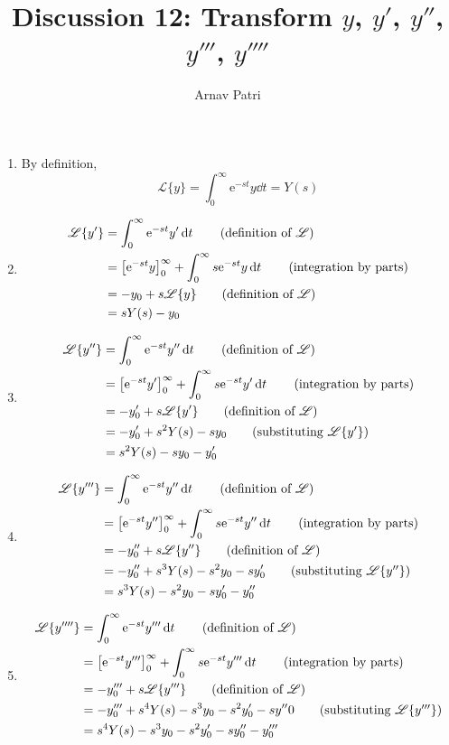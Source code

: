 \documentclass[12pt]{article}
\title{Discussion 12: Transform \(y\), \(y'\), \(y''\), \(y'''\), \(y''''\)}
\author{Arnav Patri}
\newcommand{\Ell}{\mathscr{L}}
\newcommand{\en}{\text{e}}
\begin{document}
	\maketitle
	\begin{enumerate}
		\item
			By definition,
				\[
					\Ell\{y\} = \int_0^\infty \en^{-st}y\dd{t}
						= Y(s)
				\]
		\item
			\begin{align*}
				\Ell\{y'\} &= \int_0^\infty \en^{-st}y'\dd{t} \tag{definition of \(\Ell\)} \\
					&= \left[\en^{-st}y\right]_0^\infty + \int_0^\infty s\en^{-st}y\dd{t} \tag{integration by parts} \\
					&= -y_0 + s\Ell\{y\} \tag{definition of \(\Ell\)} \\
					&= sY(s) - y_0
			\end{align*}
		\item
			\begin{align*}
				\Ell\{y''\} &= \int_0^\infty \en^{-st}y'' \dd{t} \tag{definition of \(\Ell\)} \\
					&= \left[\en^{-st}y'\right]_0^\infty + \int_0^\infty s\en^{-st}y' \dd{t} \tag{integration by parts} \\
					&= -y'_0 + s\Ell\{y'\} \tag{definition of \(\Ell\)} \\
					&= -y'_0 + s^2Y(s) - sy_0 \tag{substituting \(\Ell\{y'\}\)} \\
					&= s^2Y(s) - sy_0 - y'_0
			\end{align*}
		\item
			\begin{align*}
				\Ell\{y'''\} &= \int_0^\infty \en^{-st}y'' \dd{t} \tag{definition of \(\Ell\)} \\
					&= \left[\en^{-st}y''\right]_0^\infty + \int_0^\infty s\en^{-st}y'' \dd{t} \tag{integration by parts} \\
					&= -y''_0 + s\Ell\{y''\} \tag{definition of \(\Ell\)} \\
					&= -y''_0 + s^3Y(s) - s^2y_0 - sy'_0 \tag{substituting \(\Ell\{y''\}\)} \\
					&= s^3Y(s) - s^2y_0 - sy'_0 - y''_0
			\end{align*}
		\item
			\begin{align*}
				\Ell\{y''''\} &= \int_0^\infty \en^{-st}y''' \dd{t} \tag{definition of \(\Ell\)} \\
					&= \left[\en^{-st}y'''\right]_0^\infty + \int_0^\infty s\en^{-st}y''' \dd{t} \tag{integration by parts} \\
					&= -y'''_0 + s\Ell\{y'''\} \tag{definition of \(\Ell\)} \\
					&= -y'''_0 + s^4Y(s) - s^3y_0 - s^2y'_0 - sy''0\tag{substituting \(\Ell\{y'''\}\)} \\
					&= s^4Y(s) - s^3y_0 - s^2y'_0 - sy''_0 - y'''_0
			\end{align*}
	\end{enumerate}
\end{document}
